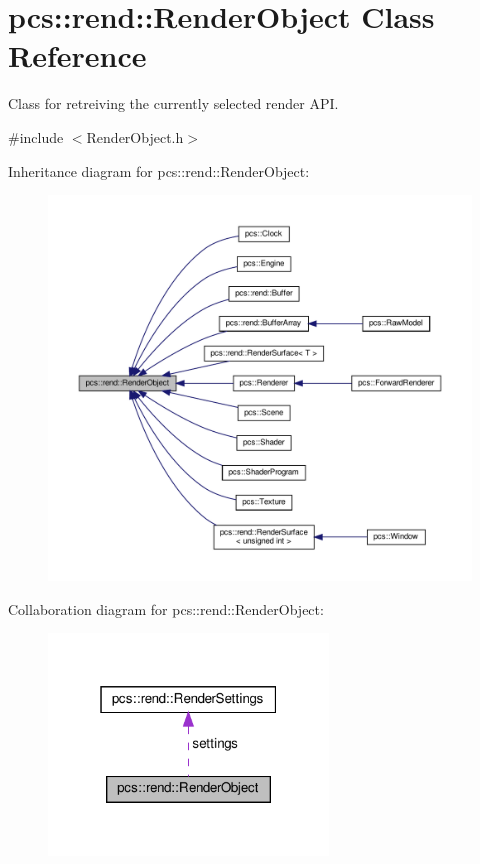 \hypertarget{classpcs_1_1rend_1_1RenderObject}{}\section{pcs\+:\+:rend\+:\+:Render\+Object Class Reference}
\label{classpcs_1_1rend_1_1RenderObject}


Class for retreiving the currently selected render A\+PI.  




{\ttfamily \#include $<$Render\+Object.\+h$>$}



Inheritance diagram for pcs\+:\+:rend\+:\+:Render\+Object\+:
\nopagebreak
\begin{figure}[H]
\begin{center}
\leavevmode
\includegraphics[width=350pt]{classpcs_1_1rend_1_1RenderObject__inherit__graph}
\end{center}
\end{figure}


Collaboration diagram for pcs\+:\+:rend\+:\+:Render\+Object\+:
\nopagebreak
\begin{figure}[H]
\begin{center}
\leavevmode
\includegraphics[width=211pt]{classpcs_1_1rend_1_1RenderObject__coll__graph}
\end{center}
\end{figure}
